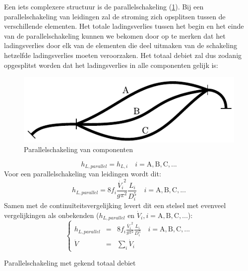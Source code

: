Een iets complexere structuur is de parallelschakeling (\ref{fig:parallelschakeling}). Bij een parallelschakeling van leidingen zal de stroming zich opsplitsen tussen de verschillende elementen. Het totale ladingsverlies tussen het begin en het einde van de parallelschakeling kunnen we bekomen door op te merken dat het ladingsverlies door elk van de elementen die deel uitmaken van de schakeling hetzelfde ladingsverlies moeten veroorzaken. Het totaal debiet zal dus zodanig opgesplitst worden dat het ladingsverlies in alle componenten gelijk is:
\begin{figure}
	\centering
	\includegraphics{fig/leidingstelsels/parallelschakeling}
	\caption{Parallelschakeling van componenten}
	\label{fig:parallelschakeling}
\end{figure}
\begin{equation}
	h_{L,parallel} = h_{L,i} \quad i=\mathrm{A},\mathrm{B},\mathrm{C},...
\end{equation}
Voor een parallelschakeling van leidingen wordt dit:
\begin{equation}
	h_{L,parallel} = 8 f_i \frac{\dot{V_i}^2}{g \pi^2} \frac{L_i}{D^5_i} \quad i=\mathrm{A},\mathrm{B},\mathrm{C},...
\end{equation}
Samen met de continuïteitsvergelijking levert dit een stelsel met evenveel vergelijkingen als onbekenden ($h_{L,parallel}$ en $\dot{V}_i, i=\mathrm{A},\mathrm{B},\mathrm{C},...$):
\begin{equation}
	\left\{
	\begin{array}{lcl}
		h_{L,parallel} &=& 8 f_i \frac{\dot{V_i}^2}{g \pi^2} \frac{L_i}{D^5_i} \quad i=\mathrm{A},\mathrm{B},\mathrm{C},... \\
		\dot{V} &=& \sum_i \dot{V}_i
	\end{array}
	\right.
	\label{eqn:parallelschakeling}
\end{equation}

\begin{voorbeeld}
	Parallelschakeling met gekend totaal debiet
\end{voorbeeld}
